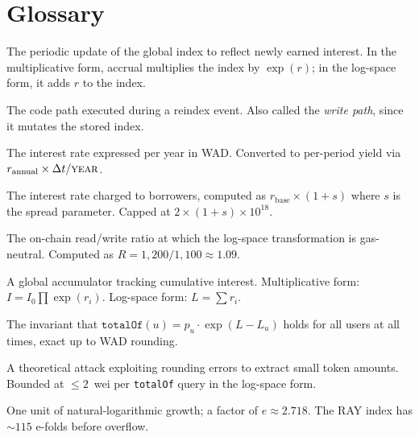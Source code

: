 \documentclass[10pt,a4paper,twocolumn]{article}
\theoremstyle{definition}
\theoremstyle{plain}
\theoremstyle{remark}
\begin{document}
\section*{Glossary}

\begin{description}[style=nextline, font=\normalfont\bfseries, leftmargin=1.5em]

\item[Accrual] The periodic update of the global index to reflect newly earned interest. In the multiplicative form, accrual multiplies the index by $\exp(r)$; in the log-space form, it adds $r$ to the index.

\item[Accrual Path] The code path executed during a reindex event. Also called the \emph{write path}, since it mutates the stored index.

\item[Annualised Rate ($r_{\text{annual}}$)] The interest rate expressed per year in WAD. Converted to per-period yield via $r_{\text{annual}} \times \Delta t / \textsc{year}$.

\item[Borrow Rate] The interest rate charged to borrowers, computed as $r_{\text{base}} \times (1 + s)$ where $s$ is the spread parameter. Capped at $2 \times (1 + s) \times 10^{18}$.

\item[Break-Even Ratio ($R$)] The on-chain read/write ratio at which the log-space transformation is gas-neutral. Computed as $R = 1{,}200 / 1{,}100 \approx 1.09$.

\item[Compounding Index] A global accumulator tracking cumulative interest. Multiplicative form: $I = I_0 \prod \exp(r_i)$. Log-space form: $L = \sum r_i$.

\item[Conservation] The invariant that $\texttt{totalOf}(u) = p_u \cdot \exp(L - L_u)$ holds for all users at all times, exact up to WAD rounding.

\item[Dust Extraction] A theoretical attack exploiting rounding errors to extract small token amounts. Bounded at $\leq 2$~wei per \texttt{totalOf} query in the log-space form.

\item[E-fold] One unit of natural-logarithmic growth; a factor of $e \approx 2.718$. The RAY index has ${\sim}115$ e-folds before overflow.


\end{description}
\end{document}

